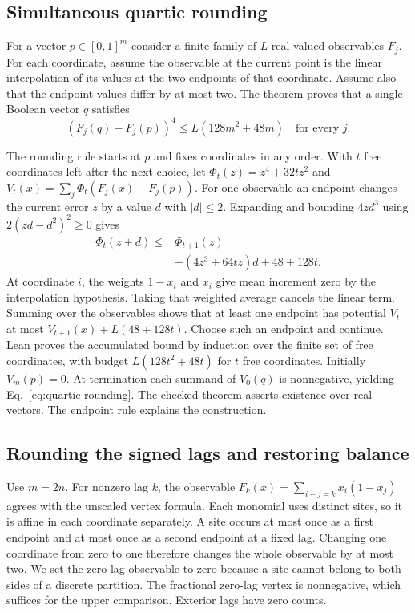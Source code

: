 \documentclass[sigplan,10pt,anonymous,review,balance=false]{acmart}
\begin{document}
\subsection{Simultaneous quartic rounding}
\label{sec:quartic-rounding}

For a vector $p\in[0,1]^m$ consider a finite family of $L$
real-valued observables $F_j$. For each coordinate, assume the
observable at the current point is the linear interpolation
of its values at the two endpoints of that coordinate. Assume
also that the endpoint values differ by at most two. The
theorem  proves that a single Boolean
vector $q$ satisfies
\begin{equation}
 (F_j(q)-F_j(p))^4\le L(128m^2+48m)
 \quad\text{for every }j .
 \label{eq:quartic-rounding}
\end{equation}

The rounding rule starts at $p$ and fixes coordinates in any
order. With $t$ free coordinates left after the next choice,
let $\Phi_t(z)=z^4+32tz^2$ and
$V_t(x)=\sum_j\Phi_t(F_j(x)-F_j(p))$. For one observable an
endpoint changes the current error $z$ by a value $d$ with
$|d|\le2$. Expanding and bounding $4zd^3$ using
$2(zd-d^2)^2\ge0$ gives
\[
 \begin{aligned}
 \Phi_t(z+d) \le {}& \Phi_{t+1}(z) \\
   &+ (4z^3+64tz)d + 48+128t .
 \end{aligned}
\]
At coordinate $i$, the weights $1-x_i$ and $x_i$ give mean
increment zero by the interpolation hypothesis. Taking that
weighted average cancels the linear term. Summing over the
observables shows that at least one endpoint has potential
$V_t$ at most $V_{t+1}(x)+L(48+128t)$. Choose such an
endpoint and continue. Lean proves the accumulated bound by
induction over the finite set of free coordinates, with
budget $L(128t^2+48t)$ for $t$ free coordinates. Initially
$V_m(p)=0$. At termination each summand of $V_0(q)$ is
nonnegative, yielding Eq.~\eqref{eq:quartic-rounding}.
The checked theorem asserts existence over real vectors.
The endpoint rule explains the construction.

\subsection{Rounding the signed lags and restoring balance}
\label{sec:lag-rounding}

Use $m=2n$. For nonzero lag $k$, the observable
$F_k(x)=\sum_{i-j=k}x_i(1-x_j)$ agrees with the unscaled
vertex formula. Each monomial uses distinct sites, so it is
affine in each coordinate separately. A site occurs at most
once as a first endpoint and at most once as a second
endpoint at a fixed lag. Changing one coordinate from zero
to one therefore changes the whole observable by at most
two. We set the zero-lag observable to zero because a site
cannot belong to both sides of a discrete partition. The
fractional zero-lag vertex is nonnegative, which suffices for
the upper comparison. Exterior lags have zero counts.
\end{document}
